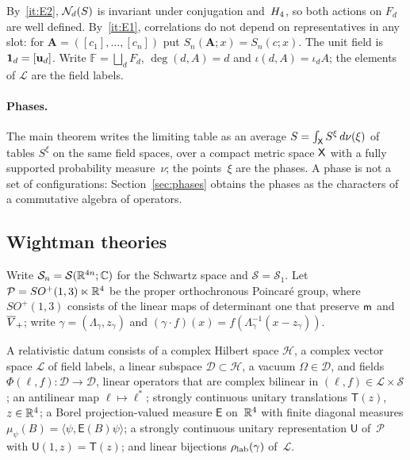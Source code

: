 By~\ref{it:E2}, $\mathcal{N}_{d}(S)$ is invariant under conjugation and~$H_4$, so both actions on $F_d$ are well defined. By~\ref{it:E1}, correlations do not depend on representatives in any slot: for $\boldsymbol A=([c_1],\ldots,[c_n])$ put $S_n(\boldsymbol A;x)=S_n(c;x)$. The unit field is $\mathbf{1}_{d}=[\mathbf u_d]$. Write $\mathbb F=\bigsqcup_dF_d$, $\deg(d,A)=d$ and $\iota(d,A)=\iota_dA$; the elements of $\mathcal L$ are the field labels.

\paragraph{Phases.}
The main theorem writes the limiting table as an average $S=\int_{\mathsf{X}}S^\xi\,d\nu(\xi)$ of tables $S^\xi$ on the same field spaces, over a compact metric space $\mathsf{X}$ with a fully supported probability measure~$\nu$; the points~$\xi$ are the phases. A phase is not a set of configurations: Section~\ref{sec:phases} obtains the phases as the characters of a commutative algebra of operators.

\subsection{Wightman theories}\label{sec:wightman-defs}

Write $\mathcal S_n=\mathcal S(\mathbb{R}^{4n};\mathbb{C})$ for the Schwartz space and $\mathcal S=\mathcal S_1$. Let $\mathcal P=SO^+(1,3)\ltimes\mathbb{R}^4$ be the proper orthochronous Poincar\'e group, where $SO^+(1,3)$ consists of the linear maps of determinant one that preserve $\mathsf{m}$ and $\overline{V}_+$; write $\gamma=(\Lambda_\gamma,z_\gamma)$ and $(\gamma\cdot f)(x)=f(\Lambda_\gamma^{-1}(x-z_\gamma))$.

\begin{definition}\label{def:D14a}\label{def:D14b}
A relativistic datum consists of a complex Hilbert space $\mathcal H$, a complex vector space $\mathcal L$ of field labels, a linear subspace $\mathcal D\subset\mathcal H$, a vacuum $\Omega\in\mathcal D$, and fields $\Phi(\ell,f):\mathcal D\to\mathcal D$, linear operators that are complex bilinear in $(\ell,f)\in\mathcal L\times\mathcal S$; an antilinear map $\ell\mapsto\ell^*$; strongly continuous unitary translations $\mathsf T(z)$, $z\in\mathbb{R}^4$; a Borel projection-valued measure $\mathsf E$ on~$\mathbb{R}^4$ with finite diagonal measures $\mu_\psi(B)=\langle\psi,\mathsf E(B)\psi\rangle$; a strongly continuous unitary representation $\mathsf U$ of~$\mathcal P$ with $\mathsf U(1,z)=\mathsf T(z)$; and linear bijections $\rho_{\rm lab}(\gamma)$ of~$\mathcal L$.
\end{definition}

